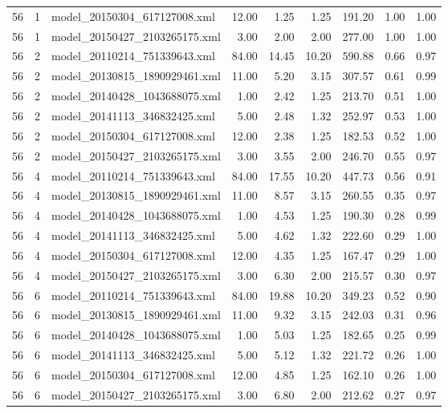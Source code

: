 \begin{table}[ht]
\begin{tabular}{rrlrrrrrr}
   56 &   1 & model\_20150304\_617127008.xml & 12.00 & 1.25 & 1.25 & 191.20 & 1.00 & 1.00 \\ 
   56 &   1 & model\_20150427\_2103265175.xml & 3.00 & 2.00 & 2.00 & 277.00 & 1.00 & 1.00 \\ 
   56 &   2 & model\_20110214\_751339643.xml & 84.00 & 14.45 & 10.20 & 590.88 & 0.66 & 0.97 \\ 
   56 &   2 & model\_20130815\_1890929461.xml & 11.00 & 5.20 & 3.15 & 307.57 & 0.61 & 0.99 \\ 
   56 &   2 & model\_20140428\_1043688075.xml & 1.00 & 2.42 & 1.25 & 213.70 & 0.51 & 1.00 \\ 
   56 &   2 & model\_20141113\_346832425.xml & 5.00 & 2.48 & 1.32 & 252.97 & 0.53 & 1.00 \\ 
   56 &   2 & model\_20150304\_617127008.xml & 12.00 & 2.38 & 1.25 & 182.53 & 0.52 & 1.00 \\ 
   56 &   2 & model\_20150427\_2103265175.xml & 3.00 & 3.55 & 2.00 & 246.70 & 0.55 & 0.97 \\ 
   56 &   4 & model\_20110214\_751339643.xml & 84.00 & 17.55 & 10.20 & 447.73 & 0.56 & 0.91 \\ 
   56 &   4 & model\_20130815\_1890929461.xml & 11.00 & 8.57 & 3.15 & 260.55 & 0.35 & 0.97 \\ 
   56 &   4 & model\_20140428\_1043688075.xml & 1.00 & 4.53 & 1.25 & 190.30 & 0.28 & 0.99 \\ 
   56 &   4 & model\_20141113\_346832425.xml & 5.00 & 4.62 & 1.32 & 222.60 & 0.29 & 1.00 \\ 
   56 &   4 & model\_20150304\_617127008.xml & 12.00 & 4.35 & 1.25 & 167.47 & 0.29 & 1.00 \\ 
   56 &   4 & model\_20150427\_2103265175.xml & 3.00 & 6.30 & 2.00 & 215.57 & 0.30 & 0.97 \\ 
   56 &   6 & model\_20110214\_751339643.xml & 84.00 & 19.88 & 10.20 & 349.23 & 0.52 & 0.90 \\ 
   56 &   6 & model\_20130815\_1890929461.xml & 11.00 & 9.32 & 3.15 & 242.03 & 0.31 & 0.96 \\ 
   56 &   6 & model\_20140428\_1043688075.xml & 1.00 & 5.03 & 1.25 & 182.65 & 0.25 & 0.99 \\ 
   56 &   6 & model\_20141113\_346832425.xml & 5.00 & 5.12 & 1.32 & 221.72 & 0.26 & 1.00 \\ 
   56 &   6 & model\_20150304\_617127008.xml & 12.00 & 4.85 & 1.25 & 162.10 & 0.26 & 1.00 \\ 
   56 &   6 & model\_20150427\_2103265175.xml & 3.00 & 6.80 & 2.00 & 212.62 & 0.27 & 0.97 \\ 

\end{tabular}
\end{table}
